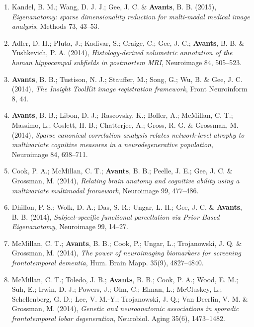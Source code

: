 \documentclass[11pt]{moderncv} %
\begin{document}
\begin{enumerate}
\item Kandel, B. M.; Wang, D. J. J.; Gee, J. C. \& \textbf{Avants}, B. B. (2015), \textit{Eigenanatomy: sparse dimensionality reduction for multi-modal medical image analysis}, Methods 73, 43--53.

\item Adler, D. H.; Pluta, J.; Kadivar, S.; Craige, C.; Gee, J. C.; \textbf{Avants}, B. B. \&  Yushkevich, P. A. (2014), \textit{Histology-derived volumetric annotation of the human hippocampal subfields in postmortem MRI}, Neuroimage 84, 505--523.

\item \textbf{Avants}, B. B.; Tustison, N. J.; Stauffer, M.; Song, G.; Wu, B. \&  Gee, J. C. (2014), \textit{The Insight ToolKit image registration framework}, Front Neuroinform 8, 44.

\item  \textbf{Avants}, B. B.; Libon, D. J.; Rascovsky, K.; Boller, A.; McMillan, C. T.; Massimo, L.; Coslett, H. B.; Chatterjee, A.; Gross, R. G. \&  Grossman, M. (2014), \textit{Sparse canonical correlation analysis relates network-level atrophy to multivariate cognitive measures in a neurodegenerative population}, Neuroimage 84, 698--711.

\item  Cook, P. A.; McMillan, C. T.; \textbf{Avants}, B. B.; Peelle, J. E.; Gee, J. C. \&  Grossman, M. (2014), \textit{Relating brain anatomy and cognitive ability using a multivariate multimodal framework}, Neuroimage 99, 477--486.

\item  Dhillon, P. S.; Wolk, D. A.; Das, S. R.; Ungar, L. H.; Gee, J. C. \&  \textbf{Avants}, B. B. (2014), \textit{Subject-specific functional parcellation via Prior Based Eigenanatomy}, Neuroimage 99, 14--27.

\item  McMillan, C. T.; \textbf{Avants}, B. B.; Cook, P.; Ungar, L.; Trojanowski, J. Q. \&  Grossman, M. (2014), \textit{The power of neuroimaging biomarkers for screening frontotemporal dementia}, Hum. Brain Mapp. 35(9), 4827--4840.

\item  McMillan, C. T.; Toledo, J. B.; \textbf{Avants}, B. B.; Cook, P. A.; Wood, E. M.; Suh, E.; Irwin, D. J.; Powers, J.; Olm, C.; Elman, L.; McCluskey, L.; Schellenberg, G. D.; Lee, V. M.-Y.; Trojanowski, J. Q.; Van Deerlin, V. M. \&  Grossman, M. (2014), \textit{Genetic and neuroanatomic associations in sporadic frontotemporal lobar degeneration}, Neurobiol. Aging 35(6), 1473--1482.


\end{enumerate}
\end{document}
